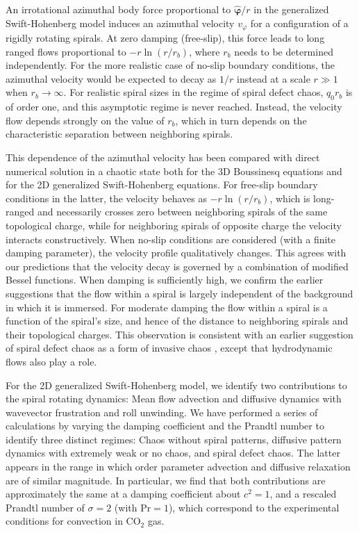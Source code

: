 \documentclass[preprint,prx,floatfix]{revtex4-1}
\begin{document}
An irrotational azimuthal body force proportional to $\hat{\bm{\varphi}}/r$ in the generalized Swift-Hohenberg model induces an azimuthal velocity $v_{\varphi}$ for a configuration of a rigidly rotating spirals. At zero damping (free-slip), this force leads to long ranged flows proportional to $-r\ln(r/r_{b})$, where $r_{b}$ needs to be determined independently. For the more realistic case of no-slip boundary conditions, the azimuthal velocity would be expected to decay as $1/r$ instead at a scale $r \gg 1$ when $r_{b} \rightarrow \infty$. For realistic spiral sizes in the regime of spiral defect chaos, $q_{0} r_{b}$ is of order one, and this asymptotic regime is never reached. Instead, the velocity flow depends strongly on the value of $r_{b}$, which in turn depends on the characteristic separation between neighboring spirals.

This dependence of the azimuthal velocity has been compared with direct numerical solution in a chaotic state both for the 3D Boussinesq equations and for the 2D generalized Swift-Hohenberg equations. For free-slip boundary conditions in the latter, the velocity behaves as $-r\ln (r/r_b)$, which is long-ranged and necessarily crosses zero between neighboring spirals of the same topological charge, while for neighboring spirals of opposite charge the velocity interacts constructively. When no-slip conditions are considered (with a finite damping parameter), the velocity profile qualitatively changes. This agrees with our predictions that the velocity decay is governed by a combination of modified Bessel functions. When damping is sufficiently high, we confirm the earlier suggestions that the flow within a spiral is largely independent of the background in which it is immersed. For moderate damping the flow within a spiral is a function of the spiral's size, and hence of the distance to neighboring spirals and their topological charges. This observation is consistent with an earlier suggestion of spiral defect chaos as a form of invasive chaos \cite{cross1996theoretical}, except that hydrodynamic flows also play a role.

For the 2D generalized Swift-Hohenberg model, we identify two contributions to the spiral rotating dynamics: Mean flow advection and diffusive dynamics with wavevector frustration and roll unwinding. We have performed a series of calculations by varying the damping coefficient and the Prandtl number to identify three distinct regimes: Chaos without spiral patterns, diffusive pattern dynamics with extremely weak or no chaos, and spiral defect chaos. The latter appears in the range in which order parameter advection and diffusive relaxation are of similar magnitude. In particular, we find that both contributions are approximately the same at a damping coefficient about $c^2 = 1$, and a rescaled Prandtl number of $\sigma = 2$ (with $\textrm{Pr}=1$), which correspond to the experimental conditions for convection in CO$_2$ gas.
\end{document}
